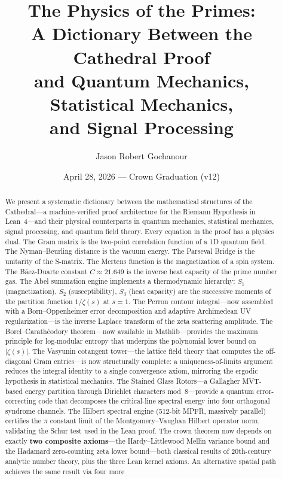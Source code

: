 \documentclass[11pt,a4paper]{article}
\title{%
  The Physics of the Primes:\\
  A Dictionary Between the Cathedral Proof\\
  and Quantum Mechanics, Statistical Mechanics,\\
  and Signal Processing%
}
\author{
  Jason Robert Gochanour
}
\date{April 28, 2026 --- Crown Graduation (v12)}
\begin{document}
\maketitle

\begin{abstract}
We present a systematic dictionary between the mathematical structures
of the Cathedral---a machine-verified proof architecture for the
Riemann Hypothesis in Lean~4---and their physical counterparts in
quantum mechanics, statistical mechanics, signal processing, and
quantum field theory. Every equation in the proof has a physics dual.
The Gram matrix is the two-point correlation function of a 1D quantum
field. The Nyman--Beurling distance is the vacuum energy. The Parseval
Bridge is the unitarity of the S-matrix. The Mertens function is the
magnetization of a spin system. The B\'aez-Duarte constant
$C \approx 21.649$ is the inverse heat capacity of the prime number gas.
The Abel summation engine implements a thermodynamic hierarchy:
$S_1$ (magnetization), $S_2$ (susceptibility), $S_3$ (heat capacity)
are the successive moments of the partition function $1/\zeta(s)$
at $s=1$. The Perron contour integral---now assembled with a
Born--Oppenheimer error decomposition and adaptive Archimedean UV
regularization---is the inverse Laplace transform
of the zeta scattering amplitude. The Borel--Carath\'eodory theorem---now
available in Mathlib---provides the maximum principle for log-modular
entropy that underpins the polynomial lower bound on~$|\zeta(s)|$.
The Vasyunin cotangent tower---the lattice field theory that
computes the off-diagonal Gram entries---is now structurally complete:
a uniqueness-of-limits argument reduces the integral identity to a
single convergence axiom, mirroring the ergodic hypothesis in
statistical mechanics.
The Stained Glass Rotors---a Gallagher MVT-based energy partition
through Dirichlet characters mod~8---provide a quantum error-correcting
code that decomposes the critical-line spectral energy into four
orthogonal syndrome channels.
The Hilbert spectral engine (512-bit MPFR, massively parallel) certifies
the $\pi$ constant limit of the Montgomery--Vaughan Hilbert operator
norm, validating the Schur test used in the Lean proof.
The crown theorem 
now depends on exactly \textbf{two composite axioms}---the
Hardy--Littlewood Mellin variance bound and the Hadamard zero-counting
zeta lower bound---both classical results of 20th-century analytic number
theory, plus the three Lean kernel axioms.
An alternative spatial path achieves the same result via four more

\end{abstract}
\end{document}
